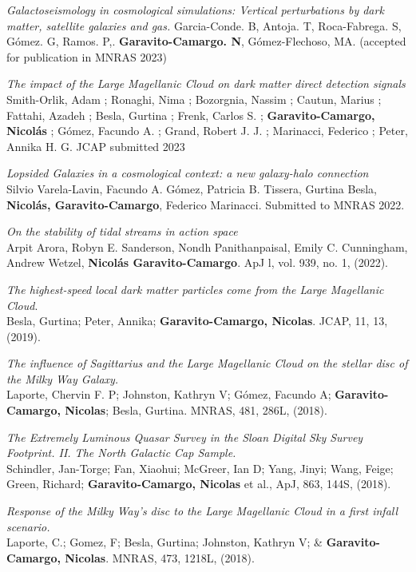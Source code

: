 \documentclass[14pt]{article}
\begin{document}
\begin{etaremune}
\item \textit{Galactoseismology in cosmological simulations: Vertical
  perturbations by dark matter, satellite galaxies and gas.}  Garcia-Conde. B,
  Antoja. T, Roca-Fabrega. S, G\'omez. G, Ramos. P,. \textbf{Garavito-Camargo.
  N}, G\'omez-Flechoso,  MA. (accepted for publication in MNRAS 2023)\\ 


\item \textit{The impact of the Large Magellanic Cloud on dark matter direct detection signals}\\
 Smith-Orlik, Adam ; Ronaghi, Nima ; Bozorgnia, Nassim ; Cautun, Marius ; Fattahi, Azadeh ; Besla, Gurtina ; Frenk, Carlos S. ; \textbf{Garavito-Camargo, Nicol\'as} ; Gómez, Facundo A. ; Grand, Robert J. J. ; Marinacci, Federico ; Peter, Annika H. G. JCAP submitted 2023\\

\item \textit{Lopsided Galaxies in a cosmological context: a new galaxy-halo connection}\\ 
Silvio Varela-Lavin, Facundo A. Gómez, Patricia B. Tissera, Gurtina Besla, \textbf{Nicol\'as, Garavito-Camargo}, Federico Marinacci. Submitted to MNRAS 2022.\\ 

\item \textit{On the stability of tidal streams in action space}\\
  Arpit Arora, Robyn E. Sanderson, Nondh Panithanpaisal, Emily C. Cunningham, Andrew Wetzel, \textbf{Nicol\'as Garavito-Camargo}. ApJ l, vol. 939, no. 1, (2022). 

\item \textit{The highest-speed local dark matter particles come from the Large
  Magellanic Cloud}. \\
  Besla, Gurtina; Peter, Annika; \textbf{Garavito-Camargo, Nicolas}. JCAP, 11,
  13, (2019).

\item \textit{The influence of Sagittarius and the Large Magellanic Cloud on the
  stellar disc of the Milky Way Galaxy.}\\
  Laporte, Chervin F. P; Johnston, Kathryn V; G\'omez, Facundo A; \textbf{Garavito-Camargo, Nicolas}; Besla,
  Gurtina. MNRAS, 481, 286L, (2018).

\item \textit{The Extremely Luminous Quasar Survey in the Sloan Digital Sky
  Survey Footprint. II. The North Galactic Cap Sample.}\\ Schindler, Jan-Torge;
  Fan, Xiaohui; McGreer, Ian D; Yang, Jinyi; Wang, Feige; Green, Richard;
  \textbf{Garavito-Camargo, Nicolas} et al., ApJ, 863, 144S, (2018).

\item \textit{Response of the Milky Way's disc to the Large Magellanic Cloud in
  a first infall scenario.}\\ Laporte, C.; Gomez, F; Besla, Gurtina; Johnston,
  Kathryn V; \& \textbf{Garavito-Camargo, Nicolas}. MNRAS, 473, 1218L, (2018).

\end{etaremune}
\end{document}
